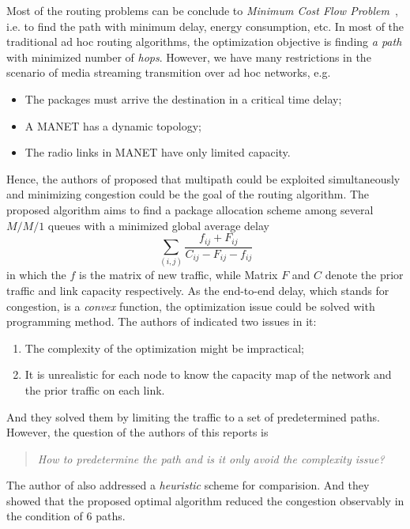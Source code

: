 \documentclass{IEEEtran}
\begin{document}
Most of the routing problems can be conclude to \emph{Minimum Cost Flow Problem}~\cite{bib:flow}, i.e. to find the path with minimum delay, energy consumption, etc. In most of the traditional ad hoc routing algorithms, the optimization objective is finding \emph{a path} with minimized number of \emph{hops}. However, we have many restrictions in the scenario of media streaming transmition over ad hoc networks, e.g.
\begin{itemize}
	\item The packages must arrive the destination in a critical time delay;
	\item A MANET has a dynamic topology;
	\item The radio links in MANET have only limited capacity.
\end{itemize}

Hence, the authors of \cite{bib:setton_icme2004} proposed that multipath could be exploited simultaneously and minimizing congestion could be the goal of the routing algorithm. The proposed algorithm aims to find a package allocation scheme among several $M/M/1$ queues with a minimized global average delay
\begin{equation}
    \sum_{(i,j)}\frac{f_{ij}+F_{ij}}{C_{ij}-F_{ij}-f_{ij} }
    \label{equ:delay}
\end{equation}
in which the $f$ is the matrix of new traffic, while Matrix $F$ and $C$ denote the prior traffic and link capacity respectively. As the end-to-end delay, which stands for congestion, is a \emph{convex} function, the optimization issue could be solved with programming method. The authors of \cite{bib:setton_icme2004} indicated two issues in it:
\begin{enumerate}
	\item The complexity of the optimization might be impractical;
	\item It is unrealistic for each node to know the capacity map of the network and the prior traffic on each link.
\end{enumerate}
And they solved them by limiting the traffic to a set of predetermined paths. However, the question of the authors of this reports is 
\begin{quote}
	\emph{How to predetermine the path and is it only avoid the complexity issue?}
\end{quote}

The author of \cite{bib:setton_icme2004} also addressed a \emph{heuristic} scheme for comparision. And they showed that the proposed optimal algorithm reduced the congestion observably in the condition of 6 paths.
\end{document}
